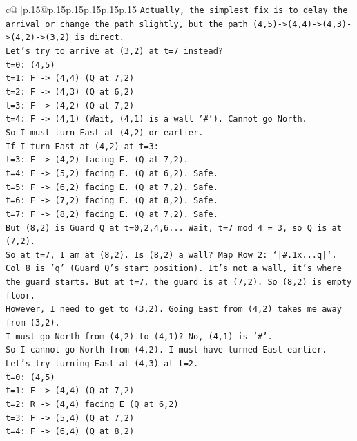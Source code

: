 \documentclass{article}
\begin{document}
{\begin{supertabular}{c@{$\;$}|p{.15\linewidth}@{}p{.15\linewidth}p{.15\linewidth}p{.15\linewidth}p{.15\linewidth}p{.15\linewidth}}
{{{\texttt{Actually, the simplest fix is to delay the arrival or change the path slightly, but the path (4,5){-}>(4,4){-}>(4,3){-}>(4,2){-}>(3,2) is direct.} \\
\texttt{Let's try to arrive at (3,2) at t=7 instead?} \\
\texttt{t=0: (4,5)} \\
\texttt{t=1: F {-}> (4,4) (Q at 7,2)} \\
\texttt{t=2: F {-}> (4,3) (Q at 6,2)} \\
\texttt{t=3: F {-}> (4,2) (Q at 7,2)} \\
\texttt{t=4: F {-}> (4,1) (Wait, (4,1) is a wall '\#'). Cannot go North.} \\
\texttt{So I must turn East at (4,2) or earlier.} \\
\texttt{If I turn East at (4,2) at t=3:} \\
\texttt{t=3: F {-}> (4,2) facing E. (Q at 7,2).} \\
\texttt{t=4: F {-}> (5,2) facing E. (Q at 6,2). Safe.} \\
\texttt{t=5: F {-}> (6,2) facing E. (Q at 7,2). Safe.} \\
\texttt{t=6: F {-}> (7,2) facing E. (Q at 8,2). Safe.} \\
\texttt{t=7: F {-}> (8,2) facing E. (Q at 7,2). Safe.} \\
\texttt{But (8,2) is Guard Q at t=0,2,4,6... Wait, t=7 mod 4 = 3, so Q is at (7,2).} \\
\texttt{So at t=7, I am at (8,2). Is (8,2) a wall? Map Row 2: `|\#.1x...q|`. Col 8 is 'q' (Guard Q's start position). It's not a wall, it's where the guard starts. But at t=7, the guard is at (7,2). So (8,2) is empty floor.} \\
\texttt{However, I need to get to (3,2). Going East from (4,2) takes me away from (3,2).} \\
\texttt{I must go North from (4,2) to (4,1)? No, (4,1) is '\#'.} \\
\texttt{So I cannot go North from (4,2). I must have turned East earlier.} \\
\texttt{Let's try turning East at (4,3) at t=2.} \\
\texttt{t=0: (4,5)} \\
\texttt{t=1: F {-}> (4,4) (Q at 7,2)} \\
\texttt{t=2: R {-}> (4,4) facing E (Q at 6,2)} \\
\texttt{t=3: F {-}> (5,4) (Q at 7,2)} \\
\texttt{t=4: F {-}> (6,4) (Q at 8,2)} \\
}}}
\end{supertabular}}
\end{document}
